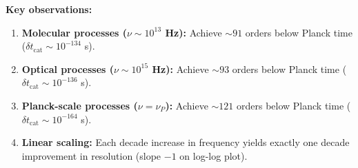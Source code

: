 \documentclass[twocolumn,10pt]{article}
\theoremstyle{remark}
\begin{document}
\textbf{Key observations:}
\begin{enumerate}
    \item \textbf{Molecular processes ($\nu \sim 10^{13}$ Hz):} Achieve $\sim 91$ orders below Planck time ($\delta t_{\text{cat}} \sim 10^{-134}$ s).

    \item \textbf{Optical processes ($\nu \sim 10^{15}$ Hz):} Achieve $\sim 93$ orders below Planck time ($\delta t_{\text{cat}} \sim 10^{-136}$ s).

    \item \textbf{Planck-scale processes ($\nu = \nu_P$):} Achieve $\sim 121$ orders below Planck time ($\delta t_{\text{cat}} \sim 10^{-164}$ s).

    \item \textbf{Linear scaling:} Each decade increase in frequency yields exactly one decade improvement in resolution (slope $-1$ on log-log plot).
\end{enumerate}
\end{document}
